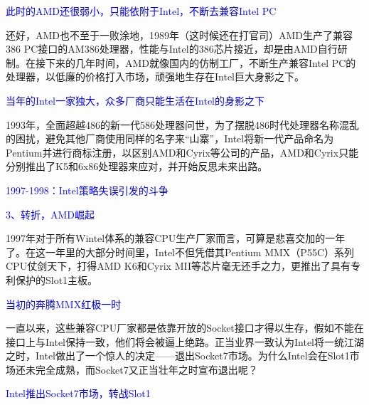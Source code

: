 \documentclass[utf8]{book}
\begin{document}
	\begin{flushleft}
		{\large \textcolor{blue}{此时的AMD还很弱小，只能依附于Intel，不断去兼容Intel PC\\}}
	\end{flushleft}
	
	还好，AMD也不至于一败涂地，1989年（这时候还在打官司）AMD生产了兼容386 PC接口的AM386处理器，性能与Intel的386芯片接近，却是由AMD自行研制。在接下来的几年时间，AMD就像国内的仿制工厂，不断生产兼容Intel PC的处理器，以低廉的价格打入市场，顽强地生存在Intel巨大身影之下。

	\begin{flushleft}
		{\large \textcolor{blue}{当年的Intel一家独大，众多厂商只能生活在Intel的身影之下\\}}
	\end{flushleft}

	1993年，全面超越486的新一代586处理器问世，为了摆脱486时代处理器名称混乱的困扰，避免其他厂商使用同样的名字来“山寨”，Intel将新一代产品命名为Pentium并进行商标注册，以区别AMD和Cyrix等公司的产品，AMD和Cyrix只能分别推出了K5和6x86处理器来应对，并开始反思未来出路。

	\begin{flushleft}
		{\Large \textcolor{blue}{1997-1998：Intel策略失误引发的斗争}}
	\end{flushleft}
	

	\begin{flushleft}
		{\large \textcolor{blue}{3、转折，AMD崛起\\}}
	\end{flushleft}
	
	1997年对于所有Wintel体系的兼容CPU生产厂家而言，可算是悲喜交加的一年了。在这一年里的大部分时间里，Intel不但凭借其Pentium MMX（P55C）系列CPU仗剑天下，打得AMD K6和Cyrix MII等芯片毫无还手之力，更推出了具有专利保护的Slot1主板。

	\begin{flushleft}
		{\large \textcolor{blue}{当初的奔腾MMX红极一时\\}}
	\end{flushleft}
	
	一直以来，这些兼容CPU厂家都是依靠开放的Socket接口才得以生存，假如不能在接口上与Intel保持一致，他们将会被逼上绝路。正当业界一致认为Intel将一统江湖之时，Intel做出了一个惊人的决定——退出Socket7市场。为什么Intel会在Slot1市场还未完全成熟，而Socket7又正当壮年之时宣布退出呢？

	\begin{flushleft}
		{\large \textcolor{blue}{	Intel推出Socket7市场，转战Slot1\\}}
	\end{flushleft}
\end{document}
